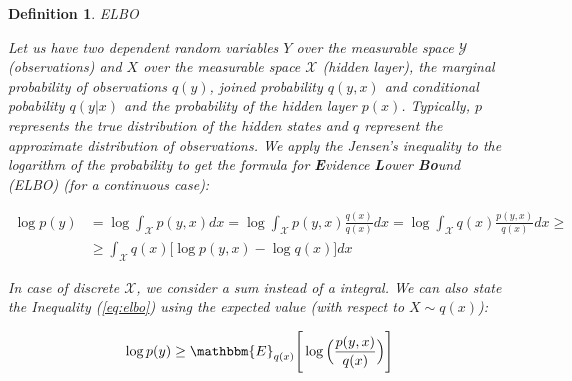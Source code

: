 \documentclass[shortabstract]{iithesis}
\newtheorem{definition}{Definition}
\begin{document}
\begin{definition} {ELBO}

    Let us have two dependent random variables $Y$ over the measurable space $\mathcal  Y$ (observations) and $X$ over the measurable space $\mathcal  X$ (hidden layer), the marginal probability of observations $q(y)$, joined probability $q(y, x)$ and conditional pobability $q(y|x)$ and the probability of the hidden layer $p(x)$. Typically, $p$ represents the true distribution of the hidden states and $q$ represent the approximate distribution of observations. We apply the Jensen's inequality to the logarithm of the probability to get the formula for \textbf{E}vidence \textbf{L}ower \textbf{Bo}und (ELBO) (for  a continuous case):

    \begin{equation} \label{eq:elbo}
    \begin{aligned}
        \log p(y) & =  \log \int_{\mathcal X} p(y, x) dx =  \log \int_{\mathcal X} p(y, x) \frac{q(x)}{q(x)} dx =  \log \int_{\mathcal X} q(x) \frac{p(y, x)}{q(x)} dx \geq \\ & \geq  \int_{\mathcal X} q(x) \big[\log p(y, x) -  \log q(x)\big] dx %
    \end{aligned}
    \end{equation}

In case of discrete $\mathcal X$, we consider a sum instead of a integral. We can also state the Inequality (\ref{eq:elbo})  using the expected value (with respect to $X \sim q(x)$):

\begin{equation*}
    \log p(y) \geq \mathbbm{E}_{q(x)} \Bigg[\log\Big(\frac{p(y, x)}{q(x)}\Big)\Bigg]
\end{equation*}
\end{definition}


\end{document}
